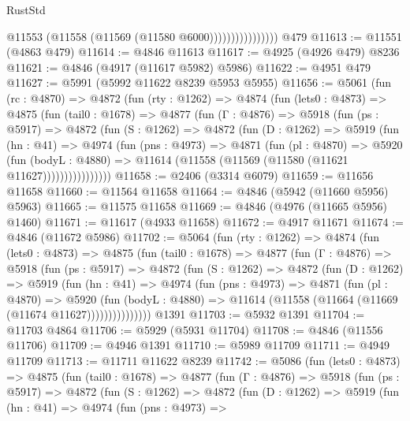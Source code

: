 \begin{lexlean}{RustStd}
\begin{coremodule}
                            @11553 (@11558 (@11569 (@11580 @6000))))))))))))))))
    @479
@11613 := @11551 (@4863 @479)
@11614 := @4846 @11613
@11617 := @4925 (@4926 @479) @8236
@11621 := @4846 (@4917 (@11617 @5982) @5986)
@11622 := @4951 @479
@11627 := @5991 (@5992 @11622 @8239 @5953 @5955)
@11656 := @5061
    (fun (rc : @4870) =>
    @4872
      (fun (rty : @1262) =>
      @4874
        (fun (lets0 : @4873) =>
        @4875
          (fun (tail0 : @1678) =>
          @4877
            (fun (Γ : @4876) =>
            @5918
              (fun (ps : @5917) =>
              @4872
                (fun (S : @1262) =>
                @4872
                  (fun (D : @1262) =>
                  @5919
                    (fun (hn : @41) =>
                    @4974
                      (fun (pns : @4973) =>
                      @4871
                        (fun (pl : @4870) =>
                        @5920
                          (fun (bodyL : @4880) =>
                          @11614 (@11558 (@11569 (@11580 (@11621 @11627))))))))))))))))
@11658 := @2406 (@3314 @6079)
@11659 := @11656 @11658
@11660 := @11564 @11658
@11664 := @4846 (@5942 (@11660 @5956) @5963)
@11665 := @11575 @11658
@11669 := @4846 (@4976 (@11665 @5956) @1460)
@11671 := @11617 (@4933 @11658)
@11672 := @4917 @11671
@11674 := @4846 (@11672 @5986)
@11702 := @5064
    (fun (rty : @1262) =>
    @4874
      (fun (lets0 : @4873) =>
      @4875
        (fun (tail0 : @1678) =>
        @4877
          (fun (Γ : @4876) =>
          @5918
            (fun (ps : @5917) =>
            @4872
              (fun (S : @1262) =>
              @4872
                (fun (D : @1262) =>
                @5919
                  (fun (hn : @41) =>
                  @4974
                    (fun (pns : @4973) =>
                    @4871
                      (fun (pl : @4870) =>
                      @5920
                        (fun (bodyL : @4880) =>
                        @11614 (@11558 (@11664 (@11669 (@11674 @11627)))))))))))))))
    @1391
@11703 := @5932 @1391
@11704 := @11703 @4864
@11706 := @5929 (@5931 @11704)
@11708 := @4846 (@11556 @11706)
@11709 := @4946 @1391
@11710 := @5989 @11709
@11711 := @4949 @11709
@11713 := @11711 @11622 @8239
@11742 := @5086
    (fun (lets0 : @4873) =>
    @4875
      (fun (tail0 : @1678) =>
      @4877
        (fun (Γ : @4876) =>
        @5918
          (fun (ps : @5917) =>
          @4872
            (fun (S : @1262) =>
            @4872
              (fun (D : @1262) =>
              @5919
                (fun (hn : @41) =>
                @4974
                  (fun (pns : @4973) =>

\end{coremodule}
\end{lexlean}
